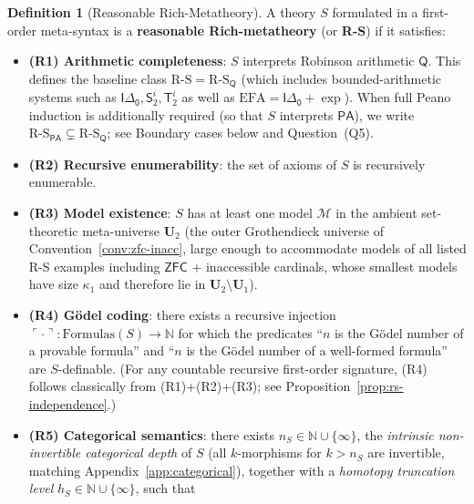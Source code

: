 \documentclass[11pt]{article}
\theoremstyle{plain}
\theoremstyle{definition}
\newtheorem{definition}[theorem]{Definition}
\newcommand{\RS}{\mathrm{R\text{-}S}}
\newcommand{\cM}{\mathcal{M}}
\newcommand{\PA}{\mathsf{PA}}
\newcommand{\ZFC}{\mathsf{ZFC}}
\begin{document}
\begin{definition}[Reasonable Rich-Metatheory]\label{def:rs}
A theory $S$ formulated in a first-order meta-syntax is a \textbf{reasonable Rich-metatheory} (or \textbf{R-S}) if it satisfies:
\begin{itemize}
\item \textbf{(R1) Arithmetic completeness}: $S$ interprets Robinson arithmetic $\mathsf{Q}$. This defines the baseline class $\RS = \RS_{\mathsf{Q}}$ (which includes bounded-arithmetic systems such as $\mathsf{I\Delta_0}, \mathsf{S}_2^i, \mathsf{T}_2^i$ as well as $\mathrm{EFA} = \mathsf{I\Delta_0} + \exp$). When full Peano induction is additionally required (so that $S$ interprets $\PA$), we write $\RS_{\PA} \subsetneq \RS_{\mathsf{Q}}$; see Boundary cases below and Question~(Q5).
\item \textbf{(R2) Recursive enumerability}: the set of axioms of $S$ is recursively enumerable.
\item \textbf{(R3) Model existence}: $S$ has at least one model $\cM$ in the ambient set-theoretic meta-universe $\mathbf{U}_2$ (the outer Grothendieck universe of Convention~\ref{conv:zfc-inacc}, large enough to accommodate models of all listed R-S examples including $\ZFC$ + inaccessible cardinals, whose smallest models have size $\kappa_1$ and therefore lie in $\mathbf{U}_2 \setminus \mathbf{U}_1$).
\item \textbf{(R4) G\"odel coding}: there exists a recursive injection $\ulcorner \cdot \urcorner : \mathrm{Formulas}(S) \to \mathbb{N}$ for which the predicates ``$n$ is the G\"odel number of a provable formula'' and ``$n$ is the G\"odel number of a well-formed formula'' are $S$-definable. (For any countable recursive first-order signature, (R4) follows classically from (R1)+(R2)+(R3); see Proposition~\ref{prop:rs-independence}.)
\item \textbf{(R5) Categorical semantics}: there exists $n_S \in \mathbb{N} \cup \{\infty\}$, the \emph{intrinsic non-invertible categorical depth} of $S$ (all $k$-morphisms for $k > n_S$ are invertible, matching Appendix~\ref{app:categorical}), together with a \emph{homotopy truncation level} $h_S \in \mathbb{N} \cup \{\infty\}$, such that
\begin{itemize}

\end{itemize}
\end{itemize}
\end{definition}
\end{document}
